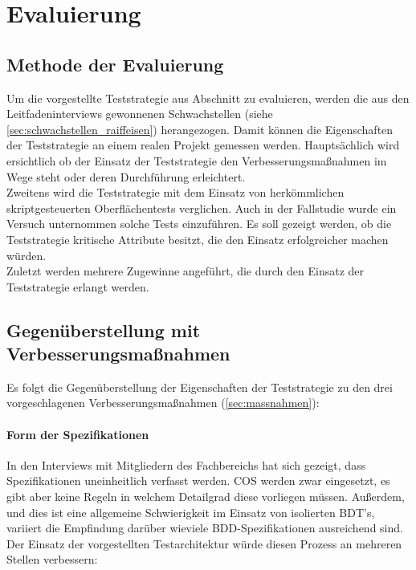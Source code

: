 \chapter{Evaluierung}
\label{sec:mbt_bdt}
\section{Methode der Evaluierung}
Um die vorgestellte Teststrategie aus Abschnitt \label{sec:mbt_bdt_concept} zu evaluieren, werden die aus den Leitfadeninterviews gewonnenen Schwachstellen (siehe \ref{sec:schwachstellen_raiffeisen}) herangezogen. Damit können die Eigenschaften der Teststrategie an einem realen Projekt gemessen werden. Hauptsächlich wird ersichtlich ob der Einsatz der Teststrategie den Verbesserungsmaßnahmen im Wege steht oder deren Durchführung erleichtert.\\
Zweitens wird die Teststrategie mit dem Einsatz von herkömmlichen skriptgesteuerten Oberflächentests verglichen. Auch in der Fallstudie wurde ein Versuch unternommen solche Tests einzuführen. Es soll gezeigt werden, ob die Teststrategie kritische Attribute besitzt, die den Einsatz erfolgreicher machen würden.\\
Zuletzt werden mehrere Zugewinne angeführt, die durch den Einsatz der Teststrategie erlangt werden.

\section{Gegenüberstellung mit Verbesserungsmaßnahmen}
Es folgt die Gegenüberstellung der Eigenschaften der Teststrategie zu den drei vorgeschlagenen Verbesserungsmaßnahmen (\ref{sec:massnahmen}):

\subsubsection{Form der Spezifikationen}
In den Interviews mit Mitgliedern des Fachbereichs hat sich gezeigt, dass Spezifikationen uneinheitlich verfasst werden. \Gls{COS} werden zwar eingesetzt, es gibt aber keine Regeln in welchem Detailgrad diese vorliegen müssen. Außerdem, und dies ist eine allgemeine Schwierigkeit im Einsatz von isolierten \Gls{BDT}'s, variiert die Empfindung darüber wieviele \Gls{BDD}-Spezifikationen ausreichend sind.\\ Der Einsatz der vorgestellten Testarchitektur würde diesen Prozess an mehreren Stellen verbessern:

